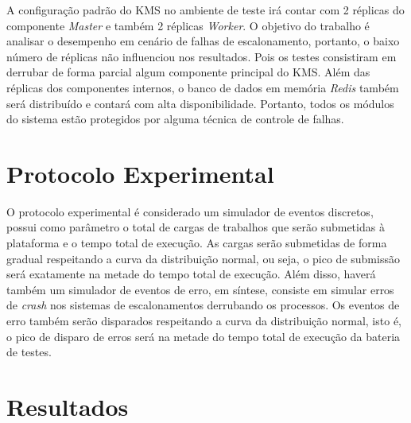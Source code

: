 A configuração padrão do \ac{KMS} no ambiente de teste irá contar com 2 réplicas do componente \textit{Master} e também 2 réplicas \textit{Worker}. O objetivo do trabalho é analisar o desempenho em cenário de falhas de escalonamento, portanto, o baixo número de réplicas não influenciou nos resultados. Pois os testes consistiram em derrubar de forma parcial algum componente principal do \ac{KMS}. Além das réplicas dos componentes internos, o banco de dados em memória \textit{Redis} também será distribuído e contará com alta disponibilidade. Portanto, todos os módulos do sistema estão protegidos por alguma técnica de controle de falhas.

\section{Protocolo Experimental}

O protocolo experimental é considerado um simulador de eventos discretos, possui como parâmetro o total de cargas de trabalhos que serão submetidas à plataforma e o tempo total de execução. As cargas serão submetidas de forma gradual respeitando a curva da distribuição normal, ou seja, o pico de submissão será exatamente na metade do tempo total de execução. Além disso, haverá também um simulador de eventos de erro, em síntese, consiste em simular erros de \textit{crash} nos sistemas de escalonamentos derrubando os processos. Os eventos de erro também serão disparados respeitando a curva da distribuição normal, isto é, o pico de disparo de erros será na metade do tempo total de execução da bateria de testes.


\section{Resultados}





















